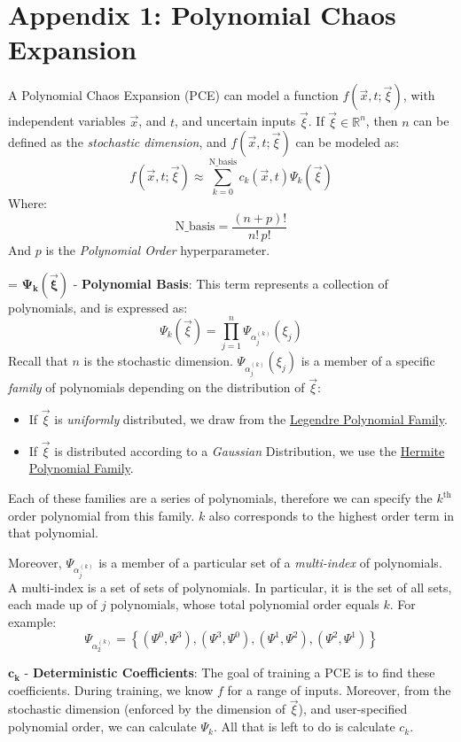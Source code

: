 \section{Appendix 1: Polynomial Chaos Expansion}
A Polynomial Chaos Expansion (PCE) can model a function $f(\vec{x},t;\vec{\xi})$, with independent variables $\vec{x}$, and $t$, and uncertain inputs $\vec{\xi}$. If $\vec{\xi} \in \mathbb{R}^n$, then $n$ can be defined as the \textit{stochastic dimension}, and $f(\vec{x},t;\vec{\xi})$ can be modeled as:
$$
f(\vec{x}, t; \vec{\xi}) \approx \sum_{k=0}^{\text{N\_basis}} c_k(\vec{x},t) \Psi_k(\vec{\xi})
$$
Where:
$$
\text{N\_basis} = \frac{(n + p)!}{n! \, p!}
$$
And $p$ is the \textit{Polynomial Order} hyperparameter.

\parskip = \baselineskip
\noindent $\mathbf{\Psi_k(\vec{\xi})}$ - \textbf{Polynomial Basis}: This term represents a collection of polynomials, and is expressed as:
$$
\Psi_k(\vec{\xi}) = \prod_{j=1}^{n} \Psi_{\alpha_j^{(k)}} (\xi_j)
$$
Recall that $n$ is the stochastic dimension. $\Psi_{\alpha_j^{(k)}} (\xi_j)$ is a member of a specific \textit{family} of polynomials depending on the distribution of $\vec{\xi}$:
\begin{itemize}
  \item If $\vec{\xi}$ is \textit{uniformly} distributed, we draw from the \href{https://en.wikipedia.org/wiki/Legendre_polynomials}{Legendre Polynomial Family}.
  \item If $\vec{\xi}$ is distributed according to a \textit{Gaussian} Distribution, we use the \href{https://en.wikipedia.org/wiki/Hermite_polynomials}{Hermite Polynomial Family}. 
\end{itemize}

\noindent Each of these families are a series of polynomials, therefore we can specify the $k^{\text{th}}$ order polynomial from this family. $k$ also corresponds to the highest order term in that polynomial.

\noindent Moreover, $\Psi_{\alpha_j^{(k)}}$ is a member of a particular set of a \textit{multi-index} of polynomials.
A multi-index is a set of sets of polynomials.
In particular, it is the set of all sets, each made up of $j$ polynomials, whose total polynomial order equals $k$.
For example:
$$
\Psi_{\alpha_2^{(k)}} = \left\{ (\Psi^0, \Psi^3), (\Psi^3, \Psi^0), (\Psi^1, \Psi^2), (\Psi^2, \Psi^1) \right\}
$$

\noindent $\mathbf{c_k}$ - \textbf{Deterministic Coefficients}: The goal of training a PCE is to find these coefficients. During training, we know $f$ for a range of inputs. Moreover, from the stochastic dimension (enforced by the dimension of $\vec{\xi}$), and user-specified polynomial order, we can calculate $\Psi_k$. All that is left to do is calculate $c_k$.

